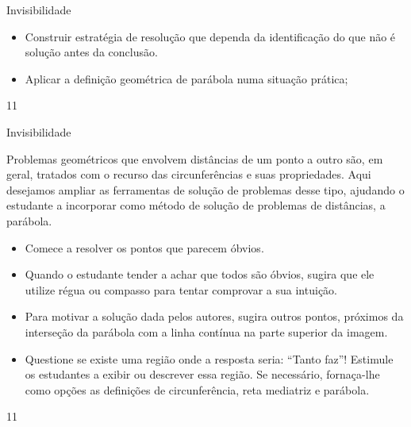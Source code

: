 \clearpage
\def\currentcolor{session2}
\begin{objectives}{Invisibilidade}
{
\begin{itemize}
\item Construir estratégia de resolução que dependa da identificação do que não é solução antes da conclusão.

\item {} 
Aplicar a definição geométrica de parábola numa situação prática;
\end{itemize}
}{1}{1}
\end{objectives}
\marginpar{\vspace{-2em}}
\begin{sugestions}{Invisibilidade}
{
Problemas geométricos que envolvem distâncias de um ponto a outro são, em geral, tratados com o recurso das circunferências e suas propriedades. Aqui desejamos ampliar as ferramentas de solução de problemas desse tipo, ajudando o estudante a incorporar como método de solução de problemas de distâncias, a parábola.
\begin{itemize}
\item {} 
Comece a resolver os pontos que parecem óbvios.

\item {} 
Quando o estudante tender a achar que todos são óbvios, sugira que ele utilize régua ou compasso para tentar comprovar a sua intuição.

\item {} 
Para motivar a solução dada pelos autores, sugira outros pontos, próximos da interseção da parábola com a linha contínua na parte superior da imagem.

\item {} 
Questione se existe uma região onde a resposta seria: “Tanto faz”! Estimule os estudantes a exibir ou descrever essa região. Se necessário, fornaça-lhe como opções as definições de circunferência, reta mediatriz e parábola.

\end{itemize}
}{1}{1}
\end{sugestions}
\marginpar{\vspace{-1em}}
